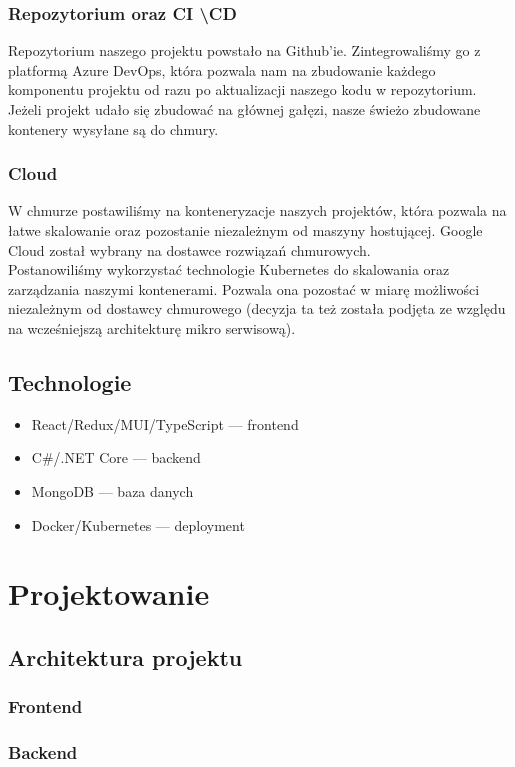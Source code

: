 \documentclass[a4paper,11pt]{report}
\begin{document}
\subsection{Repozytorium oraz CI \textbackslash CD}
Repozytorium naszego projektu powstało na Github'ie. Zintegrowaliśmy go z platformą Azure DevOps, 
która pozwala nam na zbudowanie każdego komponentu projektu od razu po aktualizacji naszego kodu w repozytorium.\\
Jeżeli projekt udało się zbudować na głównej gałęzi, nasze świeżo zbudowane kontenery wysyłane są do chmury.\\
\subsection{Cloud}
W chmurze postawiliśmy na konteneryzacje naszych projektów, która pozwala na łatwe
skalowanie oraz pozostanie niezależnym od maszyny hostującej. Google Cloud został wybrany na dostawce rozwiązań chmurowych.\\
Postanowiliśmy wykorzystać technologie Kubernetes do skalowania oraz zarządzania naszymi kontenerami. Pozwala ona pozostać w miarę możliwości
niezależnym od dostawcy chmurowego (decyzja ta też została podjęta ze względu na wcześniejszą architekturę mikro serwisową).
\section{Technologie}
		\begin{itemize}
			\item React/Redux/MUI/TypeScript — frontend
			\item C\#/.NET Core — backend
			\item MongoDB — baza danych
			\item Docker/Kubernetes — deployment
		\end{itemize}

\chapter {Projektowanie}

\section {Architektura projektu}
\subsection{Frontend} 
\subsection{Backend}
\end{document}
